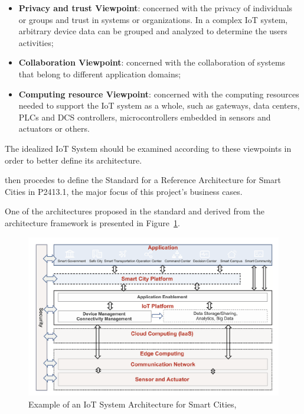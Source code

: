 \begin{itemize}
    \item \textbf{Privacy and trust Viewpoint}: concerned with the privacy of individuals or groups and trust in systems or organizations. In a complex \gls{IoT} system, arbitrary device data can be grouped and analyzed to determine the users activities;
    \item \textbf{Collaboration Viewpoint}: concerned with the collaboration of systems that belong to different application domains;
    \item \textbf{Computing resource Viewpoint}: concerned with the computing resources needed to support the \gls{IoT} system as a whole, such as gateways, data centers, \gls{PLC}s and \gls{DCS} controllers, microcontrollers embedded in sensors and actuators or others.
\end{itemize}

The idealized \gls{IoT} System should be examined according to these viewpoints in order to better define its architecture.

\cite{9032420} then procedes to define the Standard for a Reference Architecture for Smart Cities in P2413.1, the major focus of this project's business cases.

One of the architectures proposed in the standard and derived from the architecture framework is presented in Figure~\ref{fig:stateofart:arch:p2413:rasc}. 

\begin{figure}[H]
    \centering
    \includegraphics[scale=0.4]{
        assets/figures/smart-city-p2413.png
    }
    \caption[Example of an \gls{IoT} System Architecture for Smart Cities]{Example of an \gls{IoT} System Architecture for Smart Cities, \cite{9032420}}
    \label{fig:stateofart:arch:p2413:rasc}
\end{figure}

